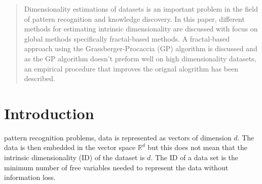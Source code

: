 \documentclass[journal]{IEEEtran}
\begin{document}
\begin{abstract}
Dimensionality estimations of datasets is an important problem in the field of pattern recognition and knowledge discovery.
 In this paper, different methods for estimating intrinsic dimensionality are discussed with focus on global methods specifically 
 fractal-based methods.  A fractal-based approach using the Grassberger-Procaccia (GP) algorithm is discussed and as the GP algorithm doesn't
 preform well on high dimensionality datasets, an empirical procedure that improves the orignal alogrithm has been described.
\end{abstract}







%
\IEEEpeerreviewmaketitle



\section{Introduction}
% 
% 
% 
% 
 pattern recognition problems, data is represented as vectors 
of dimension \(d\). The data is then embedded in the vector space \( \mathbb{R}^d \) 
but this does not mean that the intrinsic dimensionality (ID) of the dataset is \(d\). 
The ID of a data set is the minimum number of free variables needed to represent the data without information 
loss. 
\end{document}
